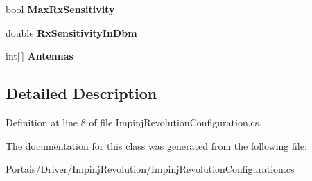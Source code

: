 \begin{DoxyCompactItemize}
\item 
bool {\bfseries Max\+Rx\+Sensitivity}\hypertarget{class_portais_1_1_driver_1_1_impinj_revolution_1_1_impinj_revolution_configuration_abd4bc88d24d4d8c307f7a23922e43fef}{}\label{class_portais_1_1_driver_1_1_impinj_revolution_1_1_impinj_revolution_configuration_abd4bc88d24d4d8c307f7a23922e43fef}

\item 
double {\bfseries Rx\+Sensitivity\+In\+Dbm}\hypertarget{class_portais_1_1_driver_1_1_impinj_revolution_1_1_impinj_revolution_configuration_a38857e5abb60d82aad850ddb9d9f5150}{}\label{class_portais_1_1_driver_1_1_impinj_revolution_1_1_impinj_revolution_configuration_a38857e5abb60d82aad850ddb9d9f5150}

\item 
int\mbox{[}$\,$\mbox{]} {\bfseries Antennas}\hypertarget{class_portais_1_1_driver_1_1_impinj_revolution_1_1_impinj_revolution_configuration_adb6b238c97872aa812645ceb0ad88a88}{}\label{class_portais_1_1_driver_1_1_impinj_revolution_1_1_impinj_revolution_configuration_adb6b238c97872aa812645ceb0ad88a88}

\end{DoxyCompactItemize}


\subsection{Detailed Description}


Definition at line 8 of file Impinj\+Revolution\+Configuration.\+cs.



The documentation for this class was generated from the following file\+:\begin{DoxyCompactItemize}
\item 
Portais/\+Driver/\+Impinj\+Revolution/Impinj\+Revolution\+Configuration.\+cs\end{DoxyCompactItemize}
